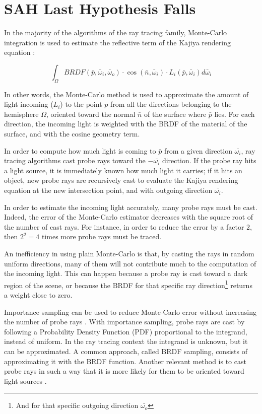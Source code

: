 \documentclass[acmtog, anonymous, review]{acmart}
\begin{document}
\section{SAH Last Hypothesis Falls}
In the majority of the algorithms of the ray tracing family, Monte-Carlo integration \cite{monte_carlo} is used to estimate the reflective term of the Kajiya rendering equation \cite{kajiya}:

\begin{equation}
  \int_\Omega BRDF(\bar{p}, \bar{\omega}_i, \bar{\omega}_o) \cdot \cos(\bar{n}, \bar{\omega}_i) \cdot L_i(\bar{p}, \bar{\omega}_i) d\bar{\omega}_i
  \label{eq:kajiya_reflective}
\end{equation}

In other words, the Monte-Carlo method is used to approximate the amount of light incoming ($L_i$) to the point $\bar{p}$ from all the directions belonging to the hemisphere $\Omega$, oriented toward the normal $\bar{n}$ of the surface where $\bar{p}$ lies. For each direction, the incoming light is weighted with the BRDF of the material of the surface, and with the cosine geometry term.

In order to compute how much light is coming to $\bar{p}$ from a given direction $\bar{\omega_i}$, ray tracing algorithms cast probe rays toward the $-\bar{\omega_i}$ direction. If the probe ray hits a light source, it is immediately known how much light it carries; if it hits an object, new probe rays are recursively cast to evaluate the Kajiya rendering equation at the new intersection point, and with outgoing direction $\bar{\omega_i}$.

In order to estimate the incoming light accurately, many probe rays must be cast. Indeed, the error of the Monte-Carlo estimator decreases with the square root of the number of cast rays. For instance, in order to reduce the error by a factor $2$, then $2^2=4$ times more probe rays must be traced.

An inefficiency in using plain Monte-Carlo is that, by casting the rays in random uniform directions, many of them will not contribute much to the computation of the incoming light. This can happen because a probe ray is cast toward a dark region of the scene, or because the BRDF for that specific ray direction\footnote{And for that specific outgoing direction $\bar{\omega_o}$} returns a weight close to zero.

Importance sampling can be used to reduce Monte-Carlo error without increasing the number of probe rays \cite{importance_sampling}. With importance sampling, probe rays are cast by following a Probability Density Function (PDF) proportional to the integrand, instead of uniform. In the ray tracing context the integrand is unknown, but it can be approximated. A common approach, called BRDF sampling, consists of approximating it with the BRDF function. Another relevant method is to cast probe rays in such a way that it is more likely for them to be oriented toward light sources \cite{light_sampling}.
\end{document}
